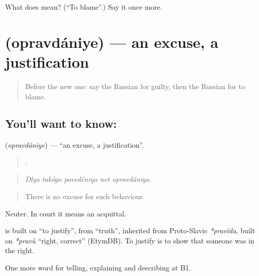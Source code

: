 \begin{tcolorbox}[breakable,colback=teal!4,colframe=teal!35!black,title={Before you move on}]
What does  mean? (\textquotedblleft{}To blame\textquotedblright{}.) Say it once more.
\end{tcolorbox}
\section[\texorpdfstring{\ru{оправдание} (opravdániye)}{оправдание (opravdániye)}]{ (opravdániye) — an excuse, a justification}

\label{lesson:RU-C352-opravdanie}



\begin{quote}
Before the new one: say the Russian for guilty, then the Russian for to blame.
\end{quote}

\subsection*{You'll want to know: }
\textbf{} (\emph{opravdániye}) — \textquotedblleft{}an excuse, a justification\textquotedblright{}.

\begin{quote}
    .
\end{quote}

\begin{quote}
\emph{Dlya takógo povedéniya net opravdániya.}
\end{quote}

\begin{quote}
There is no excuse for such behaviour.
\end{quote}

Neuter. In court it means an acquittal.

\begin{cousinweb}
\textbf{} is built on \emph{} \textquotedblleft{}to justify\textquotedblright{}, from \emph{} \textquotedblleft{}truth\textquotedblright{}, inherited from Proto-Slavic \emph{*pravĭda}, built on \emph{*pravŭ} \textquotedblleft{}right, correct\textquotedblright{} (EtymDB). To justify is to show that someone was in the right.
\end{cousinweb}

\begin{grammarlens}[title={What you've built}]
One more word for telling, explaining and describing at B1.
\end{grammarlens}

